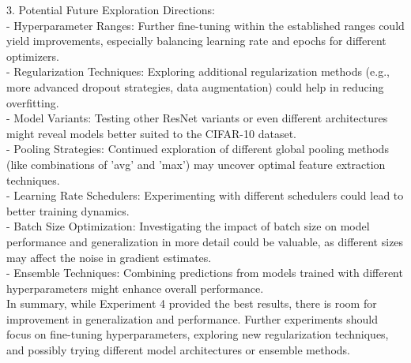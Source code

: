 \documentclass{article}
\begin{document}
\begin{tcolorbox}[enhanced jigsaw,breakable,pad at break*=1mm,
  colback=blue!5!white,colframe=blue!75!black,title=GPT-4 Experimental Logs,
  watermark color=white]
3. Potential Future Exploration Directions: \\
- Hyperparameter Ranges: Further fine-tuning within the established ranges could yield improvements, especially balancing learning rate and epochs for different optimizers. \\
- Regularization Techniques: Exploring additional regularization methods (e.g., more advanced dropout strategies, data augmentation) could help in reducing overfitting. \\
- Model Variants: Testing other ResNet variants or even different architectures might reveal models better suited to the CIFAR-10 dataset. \\
- Pooling Strategies: Continued exploration of different global pooling methods (like combinations of 'avg' and 'max') may uncover optimal feature extraction techniques. \\
- Learning Rate Schedulers: Experimenting with different schedulers could lead to better training dynamics. \\
- Batch Size Optimization: Investigating the impact of batch size on model performance and generalization in more detail could be valuable, as different sizes may affect the noise in gradient estimates. \\
- Ensemble Techniques: Combining predictions from models trained with different hyperparameters might enhance overall performance. \\

In summary, while Experiment 4 provided the best results, there is room for improvement in generalization and performance. Further experiments should focus on fine-tuning hyperparameters, exploring new regularization techniques, and possibly trying different model architectures or ensemble methods.
\end{tcolorbox}
\end{document}
